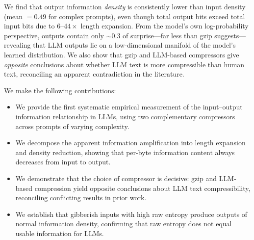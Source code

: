 We find that output information \emph{density} is consistently lower than input density (mean \densityratio $= 0.49$ for complex prompts), even though total output bits exceed total input bits due to $6$--$44\times$ length expansion. From the model's own log-probability perspective, outputs contain only ${\sim}0.3$ \bpt of surprise---far less than gzip suggests---revealing that LLM outputs lie on a low-dimensional manifold of the model's learned distribution. We also show that gzip and LLM-based compressors give \emph{opposite} conclusions about whether LLM text is more compressible than human text, reconciling an apparent contradiction in the literature.

 We make the following contributions:
\begin{itemize}[leftmargin=*,itemsep=0pt,topsep=0pt]
    \item We provide the first systematic empirical measurement of the input--output information relationship in LLMs, using two complementary compressors across prompts of varying complexity.
    \item We decompose the apparent information amplification into length expansion and density reduction, showing that per-byte information content always decreases from input to output.
    \item We demonstrate that the choice of compressor is decisive: gzip and LLM-based compression yield opposite conclusions about LLM text compressibility, reconciling conflicting results in prior work.
    \item We establish that gibberish inputs with high raw entropy produce outputs of normal information density, confirming that raw entropy does not equal usable information for LLMs.
\end{itemize}
